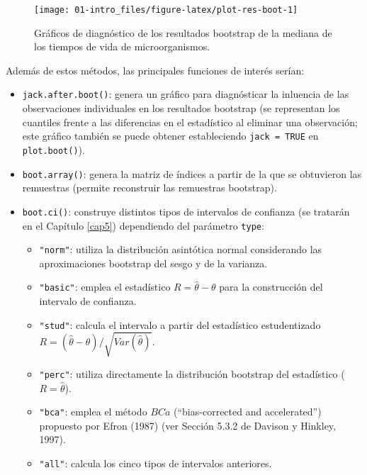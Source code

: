 \documentclass[]{book}
\theoremstyle{definition}
\theoremstyle{definition}
\theoremstyle{definition}
\theoremstyle{remark}
\begin{document}
\begin{figure}[!htb]

{\centering \texttt{[image: 01-intro\_files/figure-latex/plot-res-boot-1]} 

}

\caption{Gráficos de diagnóstico de los resultados bootstrap de la mediana de los tiempos de vida de microorganismos.}\label{fig:plot-res-boot}
\end{figure}

Además de estos métodos, las principales funciones de interés serían:

\begin{itemize}
\item
  \texttt{jack.after.boot()}: genera un gráfico para diagnósticar la
  inluencia de las observaciones individuales en los resultados
  bootstrap (se representan los cuantiles frente a las diferencias en el
  estadístico al eliminar una observación; este gráfico también se puede
  obtener estableciendo \texttt{jack\ =\ TRUE} en \texttt{plot.boot()}).
\item
  \texttt{boot.array()}: genera la matriz de índices a partir de la que
  se obtuvieron las remuestras (permite reconstruir las remuestras
  bootstrap).
\item
  \texttt{boot.ci()}: construye distintos tipos de intervalos de
  confianza (se tratarán en el Capítulo \ref{cap5}) dependiendo del
  parámetro \texttt{type}:

  \begin{itemize}
  \item
    \texttt{"norm"}: utiliza la distribución asintótica normal
    considerando las aproximaciones bootstrap del sesgo y de la
    varianza.
  \item
    \texttt{"basic"}: emplea el estadístico \(R = \hat \theta - \theta\)
    para la construcción del intervalo de confianza.
  \item
    \texttt{"stud"}: calcula el intervalo a partir del estadístico
    estudentizado
    \(R = \left( \hat \theta - \theta \right) / \sqrt{Var(\hat \theta)}\).
  \item
    \texttt{"perc"}: utiliza directamente la distribución bootstrap del
    estadístico (\(R = \hat \theta\)).
  \item
    \texttt{"bca"}: emplea el método \(BCa\) (``bias-corrected and
    accelerated'') propuesto por Efron (1987) (ver Sección 5.3.2 de
    Davison y Hinkley, 1997).
  \item
    \texttt{"all"}: calcula los cinco tipos de intervalos anteriores.
  \end{itemize}
\end{itemize}
\end{document}
